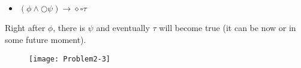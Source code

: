 \subsection{}

\begin{itemize}
   \item[] $(\phi \land \bigcirc \psi) \rightarrow \diamond \square \tau$ 
\end{itemize}

\indent Right after $\phi$, there is $\psi$ and eventually $\tau$ will become true (it can be now or in some future moment).

\begin{figure}[h!]
	\centering \texttt{[image: Problem2-3]}
\end{figure}
